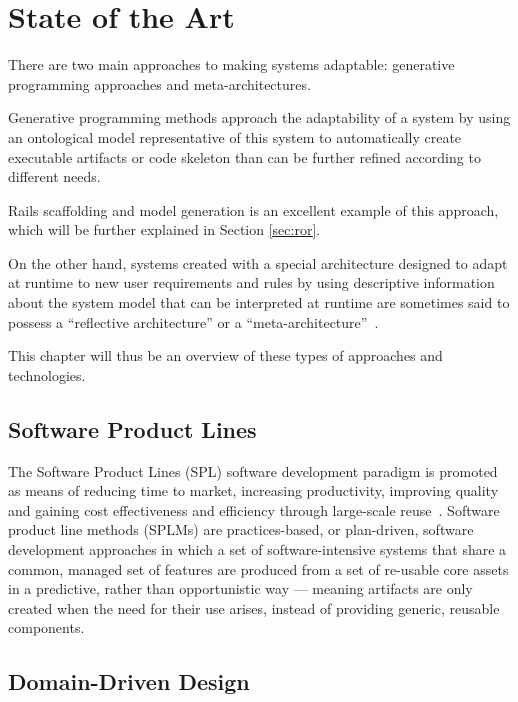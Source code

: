 \chapter{State of the Art}\label{chap:sota}

There are two main approaches to making systems adaptable: generative programming approaches and meta-architectures.

Generative programming methods approach the adaptability of a system by using an ontological model representative of this system to automatically create executable artifacts or code skeleton than can be further refined according to different needs.

Rails scaffolding and model generation is an excellent example of this approach, which will be further explained in Section \ref{sec:ror}.

On the other hand, systems created with a special architecture designed to adapt at runtime to new user requirements and rules by using descriptive information about the system model that can be interpreted at runtime are sometimes said to possess a ``reflective architecture'' or a ``meta-architecture''~\cite{YBJ01}.

This chapter will thus be an overview of these types of approaches and technologies.

\section{Software Product Lines}\label{sec:spl}

The Software Product Lines (SPL) software development paradigm is promoted as means of reducing time to market, increasing productivity, improving quality and gaining cost effectiveness and efficiency through large-scale reuse~\cite{TC06}. Software product line methods (SPLMs) are practices-based, or plan-driven, software development approaches in which a set of software-intensive systems that share a common, managed set of features are produced from a set of re-usable core assets in a predictive, rather than opportunistic way --- meaning artifacts are only created when the need for their use arises, instead of providing generic, reusable components.

\section{Domain-Driven Design}\label{sec:ddd}

